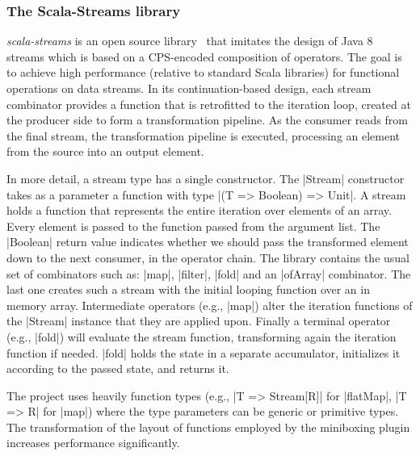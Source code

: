 \subsubsection{The Scala-Streams library} \emph{scala-streams} is an open source library~\cite{biboudis-streams} that 
imitates the design of Java 8 streams which is based on a CPS-encoded composition of operators. The goal is to achieve high performance
(relative to standard Scala libraries) for functional operations on data
streams. In its continuation-based design, each stream combinator provides a function that is retrofitted to the iteration loop, created at the producer side to form a transformation pipeline. As the consumer reads from the final stream, the transformation pipeline is executed, processing an element from the source into an output element. 


In more detail, a stream type has a single constructor. The |Stream| constructor takes as a parameter a function with type |(T => Boolean) => Unit|. A stream holds a function that represents the entire iteration over elements of an array. Every element is passed to the function passed from the argument list. The |Boolean| return value indicates whether we should pass the transformed element down to the next consumer, in the operator chain. The library contains the usual set of combinators such as: |map|, |filter|, |fold| and an |ofArray| combinator. The last one creates such a stream with the initial looping function over an in memory array. Intermediate operators (e.g., |map|) alter the iteration functions of the |Stream| instance that they are applied upon. Finally a terminal operator (e.g., |fold|) will evaluate the stream function, transforming again the iteration function if needed. |fold| holds the state in a separate accumulator, initializes it according to the passed state, and returns it.

The project uses heavily function types (e.g., |T => Stream[R]| for |flatMap|, |T => R| for |map|) where the type parameters can be generic or primitive types. The transformation of the layout of functions employed by the miniboxing plugin increases performance significantly.



